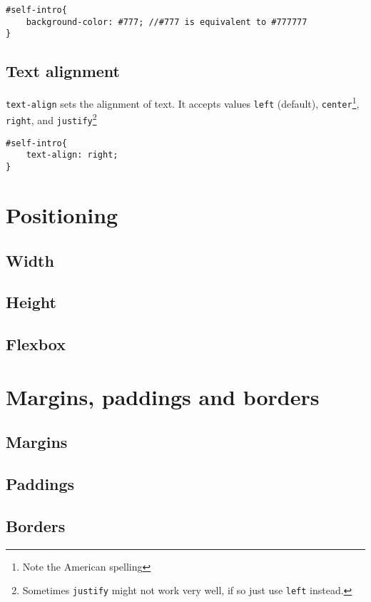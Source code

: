 \begin{lstlisting}[language=pug]
#self-intro{
    background-color: #777; //#777 is equivalent to #777777
}
\end{lstlisting}

\subsection{Text alignment}

\texttt{text-align} sets the alignment of text. It accepts values \texttt{left} (default), \texttt{center}\footnote{Note the American spelling}, \texttt{right}, and \texttt{justify}\footnote{Sometimes \texttt{justify} might not work very well, if so just use \texttt{left} instead.}

\begin{lstlisting}[language=pug]
#self-intro{
    text-align: right;
}
\end{lstlisting}

\section{Positioning}

\subsection{Width}

\subsection{Height}

\subsection{Flexbox}

\section{Margins, paddings and borders}
\label{sec:margin}

\subsection{Margins}

\subsection{Paddings}

\subsection{Borders}

